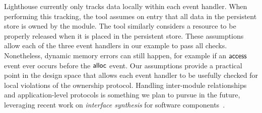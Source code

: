 Lighthouse currently only tracks data locally within each
event handler.  
%
When performing this tracking, the tool assumes on entry that all data
in the persistent store is owned by the module.
%
The tool similarly considers a resource to be properly released when
it is placed in the persistent store.  
%
These assumptions allow each of the three event handlers in our
example to pass all checks.  Nonetheless, dynamic memory errors can still happen, 
for example if an ${\mathsf{access}}$ event
ever occurs before the ${\mathsf{alloc}}$ event.  
%
Our assumptions provide a practical point in the design space
that allows each event handler to be usefully checked for local
violations of the ownership protocol.  
%
Handling inter-module relationships and application-level
protocols is something we plan to pursue in the future, leveraging
recent work on {\em interface synthesis} 
for software components~\cite{AlurPOPL05,HJM05}.

